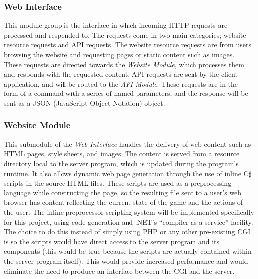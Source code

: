 \subsubsection{Web Interface}
This module group is the interface in which incoming HTTP requests are processed and responded to. The requests come in two main categories; website resource requests and API requests. The website resource requests are from users browsing the website and requesting pages or static content such as images. These requests are directed towards the \emph{Website Module}, which processes them and responds with the requested content. API requests are sent by the client application, and will be routed to the \emph{API Module}. These requests are in the form of a command with a series of named parameters, and the response will be sent as a JSON (JavaScript Object Notation) object.

\subsubsection{Website Module}
This submodule of the \emph{Web Interface} handles the delivery of web content such as HTML pages, style sheets, and images. The content is served from a resource directory local to the server program, which is updated during the program's runtime. It also allows dynamic web page generation through the use of inline C$\sharp$ scripts in the source HTML files. These scripts are used as a preprocessing language while constructing the page, so the resulting file sent to a user's web browser has content reflecting the current state of the game and the actions of the user. The inline preprocessor scripting system will be implemented specifically for this project, using code generation and .NET's ``compiler as a service'' facility. The choice to do this instead of simply using PHP or any other pre-existing CGI is so the scripts would have direct access to the server program and its components (this would be true because the scripts are actually contained within the server program itself). This would provide increased performance and would eliminate the need to produce an interface between the CGI and the server.

